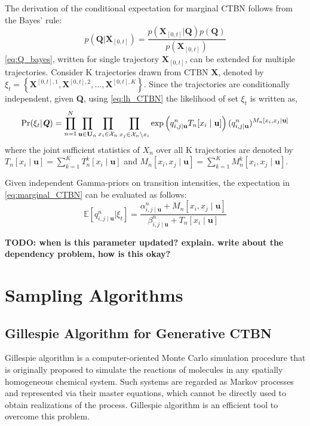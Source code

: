 The derivation of the conditional expectation for marginal CTBN follows from the Bayes' rule:
\begin{equation}
p\left(\textbf{Q} | \textbf{X}_{[0,t]}\right)=\frac{p\left(\textbf{X}_{[0,t]} | \textbf{Q}\right) p(\textbf{Q})}{p\left(\textbf{X}_{[0,t]}\right)}
\label{eq:Q_bayes}
\end{equation}
\autoref{eq:Q_bayes}, written for single trajectory $ \textbf{X}_{[0,t]} $, can be extended for multiple trajectories. Consider K trajectories drawn from CTBN \textbf{X}, denoted by $ \xi_t = \left\lbrace \textbf{X}^{[0,t], 1}, \textbf{X}^{[0,t], 2}, ..., \textbf{X}^{[0,t], K} \right\rbrace  $. Since the trajectories are conditionally independent, given \textbf{Q}, using \autoref{eq:lh_CTBN} the likelihood of set $ \xi_t $ is written as,
\begin{align}
\operatorname{Pr}( \xi_t  | \textbf{\textit{Q}} ) = \prod_{n=1}^{N} \prod_{\textbf{u} \in \mathcal{\textbf{U}}_{n}} \prod_{x_i \in \mathcal{X}_{n}} \prod_{x_j \in \mathcal{X}_{n} \backslash x_i}
\exp \left( q_{i,j\mid \textbf{u}}^{n} T_{n}[x_i\mid \textbf{u}]\right) (q_{i,j\mid \textbf{u}}^{n})^{M_{n}[x_i, x_j\mid \textbf{u}]}
\label{eq:lh_dataset_CTBN}
\end{align}
where the joint sufficient statistics of $ X_n $ over all K trajectories are denoted by  $ T_{n}[x_i\mid \textbf{u}] = \sum_{k=1}^{K} T_{n}^k[x_i\mid \textbf{u}] $ and $ M_{n}[x_i, x_j\mid \textbf{u}] =\sum_{k=1}^{K} M_{n}^k[x_i, x_j\mid \textbf{u}]$.

Given independent Gamma-priors on transition intensities, the expectation in \autoref{eq:marginal_CTBN} can be evaluated as follows:
\begin{equation}
	\mathbb{E}\left[q_{i,j\mid \textbf{u}}^{n} | \xi_{t}\right]=\frac{\alpha^n_{i,j\mid \textbf{u}}+M_{n}[x_i, x_j\mid \textbf{u}]}{\beta^n_{i,j\mid \textbf{u}}+T_{n}[x_i \mid \textbf{u}]}
	\label{eq:estimated_Q}
\end{equation}

\textbf{TODO: when is this parameter updated? explain. write about the dependency problem, how is this okay?}

\section{Sampling Algorithms}
\label{sec:sampling_alg}
\subsection{Gillespie Algorithm for Generative CTBN}
Gillespie algorithm is a computer-oriented Monte Carlo simulation procedure that is originally proposed to simulate the reactions of molecules in any spatially homogeneous chemical system. Such systems are regarded as Markov processes and represented via their master equations, which cannot be directly used to obtain realizations of the process. Gillespie algorithm is an efficient tool to overcome this problem. \cite{Gillespie1976}

